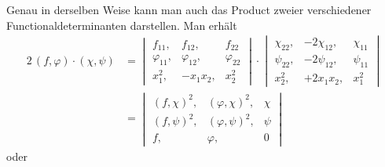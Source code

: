 Genau in derselben Weise kann man auch das Product zweier verschiedener Functionaldeterminanten darstellen. Man erhält
\[
\begin{aligned}
2\,(f, \varphi)\cdot(\chi, \psi) &= \begin{vmatrix} f_{11}, & f_{12}, & f_{22} \\ \varphi_{11}, & \varphi_{12}, & \varphi_{22} \\ x_1^2, & -x_1x_2, & x_2^2 \end{vmatrix} \cdot \begin{vmatrix} \chi_{22}, & -2\chi_{12}, & \chi_{11} \\ \psi_{22}, & -2\psi_{12}, & \psi_{11} \\ x_2^2, & +2x_1x_2, & x_1^2 \end{vmatrix} \\
&= \begin{vmatrix} (f, \chi)^2, & (\varphi, \chi)^2, & \chi \\ (f, \psi)^2, & (\varphi, \psi)^2, & \psi \\ f, & \varphi, & 0 \end{vmatrix}
\end{aligned}
\]
oder



